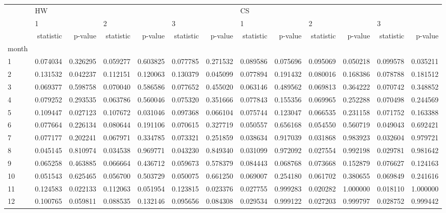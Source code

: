 \begin{tabular}{lrrrrrrrrrrrr}
\toprule
{} & \multicolumn{6}{l}{HW} & \multicolumn{6}{l}{CS} \\
{} & \multicolumn{2}{l}{1} & \multicolumn{2}{l}{2} & \multicolumn{2}{l}{3} & \multicolumn{2}{l}{1} & \multicolumn{2}{l}{2} & \multicolumn{2}{l}{3} \\
{} & statistic &   p-value & statistic &   p-value & statistic &   p-value & statistic &   p-value & statistic &   p-value & statistic &   p-value \\
month &           &           &           &           &           &           &           &           &           &           &           &           \\
\midrule
1     &  0.074034 &  0.326295 &  0.059277 &  0.603825 &  0.077785 &  0.271532 &  0.089586 &  0.075696 &  0.095069 &  0.050218 &  0.099578 &  0.035211 \\
2     &  0.131532 &  0.042237 &  0.112151 &  0.120063 &  0.130379 &  0.045099 &  0.077894 &  0.191432 &  0.080016 &  0.168386 &  0.078788 &  0.181512 \\
3     &  0.069377 &  0.598758 &  0.070040 &  0.586586 &  0.077652 &  0.455020 &  0.063146 &  0.489562 &  0.069813 &  0.364222 &  0.070742 &  0.348852 \\
4     &  0.079252 &  0.293535 &  0.063786 &  0.560046 &  0.075320 &  0.351666 &  0.077843 &  0.155356 &  0.069965 &  0.252288 &  0.070498 &  0.244569 \\
5     &  0.109447 &  0.027123 &  0.107672 &  0.031046 &  0.097368 &  0.066104 &  0.075744 &  0.123047 &  0.066535 &  0.231158 &  0.071752 &  0.163388 \\
6     &  0.077664 &  0.226134 &  0.080644 &  0.191106 &  0.070615 &  0.327719 &  0.050557 &  0.656168 &  0.054550 &  0.560719 &  0.049043 &  0.692421 \\
7     &  0.077177 &  0.202241 &  0.067971 &  0.334785 &  0.073321 &  0.251859 &  0.038634 &  0.917039 &  0.031868 &  0.983923 &  0.032604 &  0.979721 \\
8     &  0.045145 &  0.810974 &  0.034538 &  0.969771 &  0.043230 &  0.849340 &  0.031099 &  0.972092 &  0.027554 &  0.992198 &  0.029781 &  0.981642 \\
9     &  0.065258 &  0.463885 &  0.066664 &  0.436712 &  0.059673 &  0.578379 &  0.084443 &  0.068768 &  0.073668 &  0.152879 &  0.076627 &  0.124163 \\
10    &  0.051543 &  0.625465 &  0.056700 &  0.503729 &  0.050075 &  0.661250 &  0.069007 &  0.254180 &  0.061702 &  0.380655 &  0.069849 &  0.241616 \\
11    &  0.124583 &  0.022133 &  0.112063 &  0.051954 &  0.123815 &  0.023376 &  0.027755 &  0.999283 &  0.020282 &  1.000000 &  0.018110 &  1.000000 \\
12    &  0.100765 &  0.059811 &  0.088535 &  0.132146 &  0.095656 &  0.084308 &  0.029534 &  0.999122 &  0.027203 &  0.999797 &  0.028752 &  0.999442 \\
\bottomrule
\end{tabular}
